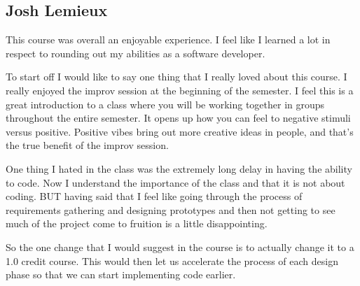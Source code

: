 \documentclass[12pt,letterpaper]{article}
\begin{document}
\clearpage
\subsection{Josh Lemieux}
This course was overall an enjoyable experience. I feel like I learned a lot in respect to rounding out my abilities as a software developer.\par 
To start off I would like to say one thing that I really loved about this course. I really enjoyed the improv session at the beginning of the semester. I feel this is a great introduction to a class where you will be working together in groups throughout the entire semester. It opens up how you can feel to negative stimuli versus positive. Positive vibes bring out more creative ideas in people, and that’s the true benefit of the improv session.\par
	One thing I hated in the class was the extremely long delay in having the ability to code. Now I understand the importance of the class and that it is not about coding. BUT having said that I feel like going through the process of requirements gathering and designing prototypes and then not getting to see much of the project come to fruition is a little disappointing.\par 
	So the one change that I would suggest in the course is to actually change it to a 1.0 credit course. This would then let us accelerate the process of each design phase so that we can start implementing code earlier.


\clearpage
\end{document}
